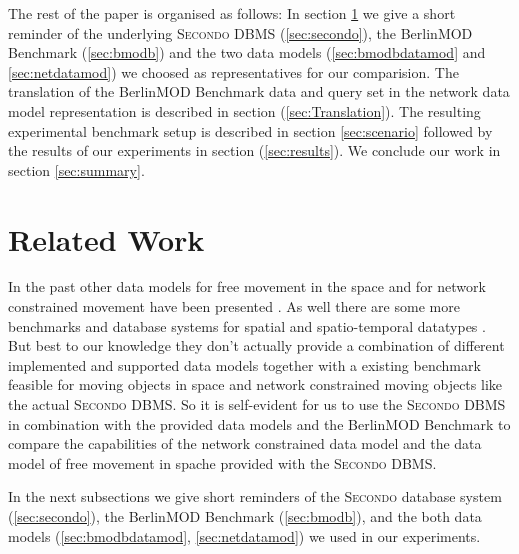 \documentclass[a4paper]{article}
\newcommand{\secondo}{\textsc{Secondo}}
\newcommand{\bmodb} {BerlinMOD Benchmark}
\begin{document}
The rest of the paper is organised as follows: In section \ref{sec:relWork} we give a
short reminder of the underlying \secondo{} DBMS (\ref{sec:secondo}), the \bmodb{}
(\ref{sec:bmodb}) and the two data models (\ref{sec:bmodbdatamod}
and \ref{sec:netdatamod}) we choosed as representatives for our comparision.
The translation of the \bmodb{} data and query set in the network data model
representation is described in section (\ref{sec:Translation}). The resulting
experimental benchmark setup is described in section \ref{sec:scenario} followed
by the results of our experiments in section (\ref{sec:results}).
We conclude our work in section \ref{sec:summary}.
\section{Related Work}
\label{sec:relWork}
In the past other data models for free movement in the space
\cite{335426,chenzaniolosqlst} and for network constrained movement have been
presented \cite{1146465,956692,VazWolfNetMod}. As well there are some more
benchmarks \cite{COSTBenchmark, QueriesTheodoridis} and database systems for
spatial and spatio-temporal datatypes \cite{HERMES,1054151}. But best to our
knowledge they don't actually provide a combination of different implemented
and supported data models together with a existing benchmark feasible for moving
objects in space and network constrained moving objects like the actual
\secondo{} DBMS. So it is self-evident for us to use the \secondo{} DBMS in
combination with the provided data models and the \bmodb{} to compare the
capabilities of the network constrained data model and the data model of free
movement in spache provided with the \secondo{} DBMS.

In the next subsections we give short reminders of the \secondo{} database system
(\ref{sec:secondo}), the \bmodb{} (\ref{sec:bmodb}), and the both data models
(\ref{sec:bmodbdatamod}, \ref{sec:netdatamod}) we used in our experiments.
\end{document}
